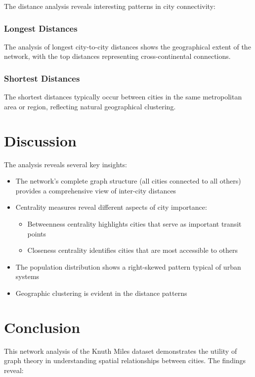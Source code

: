 \documentclass{article}
\begin{document}
The distance analysis reveals interesting patterns in city connectivity:

\subsubsection{Longest Distances}
The analysis of longest city-to-city distances shows the geographical extent of the network, with the top distances representing cross-continental connections.

\subsubsection{Shortest Distances}
The shortest distances typically occur between cities in the same metropolitan area or region, reflecting natural geographical clustering.

\section{Discussion}

The analysis reveals several key insights:

\begin{itemize}
    \item The network's complete graph structure (all cities connected to all others) provides a comprehensive view of inter-city distances
    \item Centrality measures reveal different aspects of city importance:
    \begin{itemize}
        \item Betweenness centrality highlights cities that serve as important transit points
        \item Closeness centrality identifies cities that are most accessible to others
    \end{itemize}
    \item The population distribution shows a right-skewed pattern typical of urban systems
    \item Geographic clustering is evident in the distance patterns
\end{itemize}

\section{Conclusion}

This network analysis of the Knuth Miles dataset demonstrates the utility of graph theory in understanding spatial relationships between cities. The findings reveal:
\end{document}
